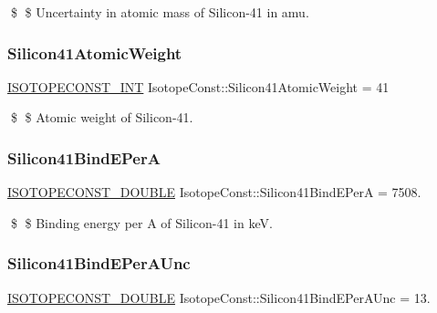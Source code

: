 \$ \$ Uncertainty in atomic mass of Silicon-\/41 in amu. \mbox{\label{group___isotope_const-_silicon-_si41_gac1082f4fffc39f49f3739ecf6b4cab50}} 
\subsubsection{\texorpdfstring{Silicon41\+Atomic\+Weight}{Silicon41AtomicWeight}}
{\footnotesize\ttfamily \mbox{\hyperlink{group___isotope_const-_macros_ga5f18360b3e99483a35c32d789e62621c}{I\+S\+O\+T\+O\+P\+E\+C\+O\+N\+S\+T\+\_\+\+I\+NT}} Isotope\+Const\+::\+Silicon41\+Atomic\+Weight = 41}

\$ \$ Atomic weight of Silicon-\/41. \mbox{\label{group___isotope_const-_silicon-_si41_ga046c35c2aa7db7848a52aa1d8341d74a}} 
\subsubsection{\texorpdfstring{Silicon41\+Bind\+E\+PerA}{Silicon41BindEPerA}}
{\footnotesize\ttfamily \mbox{\hyperlink{group___isotope_const-_macros_ga8f45a7272ce02c0b4c65c44636ed719a}{I\+S\+O\+T\+O\+P\+E\+C\+O\+N\+S\+T\+\_\+\+D\+O\+U\+B\+LE}} Isotope\+Const\+::\+Silicon41\+Bind\+E\+PerA = 7508.}

\$ \$ Binding energy per A of Silicon-\/41 in keV. \mbox{\label{group___isotope_const-_silicon-_si41_gabf1bbf647b4854d790c2d40780f54e0f}} 
\subsubsection{\texorpdfstring{Silicon41\+Bind\+E\+Per\+A\+Unc}{Silicon41BindEPerAUnc}}
{\footnotesize\ttfamily \mbox{\hyperlink{group___isotope_const-_macros_ga8f45a7272ce02c0b4c65c44636ed719a}{I\+S\+O\+T\+O\+P\+E\+C\+O\+N\+S\+T\+\_\+\+D\+O\+U\+B\+LE}} Isotope\+Const\+::\+Silicon41\+Bind\+E\+Per\+A\+Unc = 13.}

